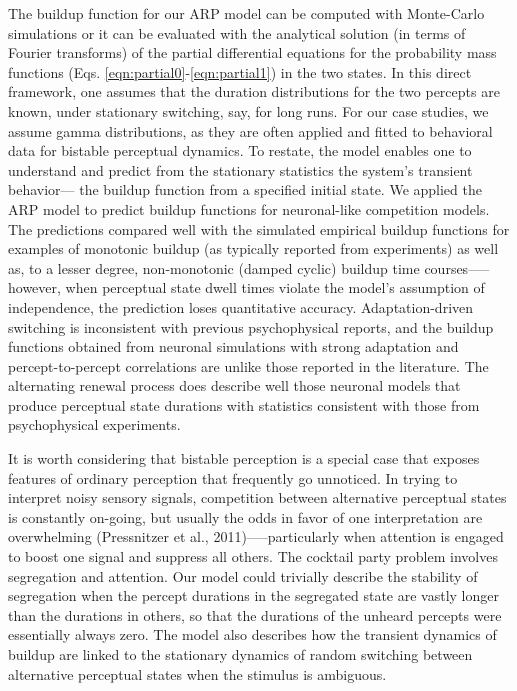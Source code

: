 The buildup function for our ARP model can be computed with Monte-Carlo simulations or it can be evaluated with the analytical solution (in terms of Fourier transforms) of the partial differential equations for the probability mass functions (Eqs. \ref{eqn:partial0}-\ref{eqn:partial1}) in the two states. In this direct framework, one assumes that the duration distributions for the two percepts are known, under stationary switching, say, for long runs. For our case studies, we assume gamma distributions, as they are often applied and fitted to behavioral data for bistable perceptual dynamics. To restate, the model enables one to understand and predict from the stationary statistics the system’s transient behavior--- the buildup function from a specified initial state. We applied the ARP model to predict buildup functions for neuronal-like competition models. The predictions compared well with the simulated empirical buildup functions for examples of monotonic buildup (as typically reported from experiments) as well as, to a lesser degree, non-monotonic (damped cyclic) buildup time courses—-- however, when perceptual state dwell times violate the model’s assumption of independence, the prediction loses quantitative accuracy. Adaptation-driven switching is inconsistent with previous psychophysical reports, and the buildup functions obtained from neuronal simulations with strong adaptation and percept-to-percept correlations are unlike those reported in the literature. The alternating renewal process does describe well those neuronal models that produce perceptual state durations with statistics consistent with those from psychophysical experiments.

It is worth considering that bistable perception is a special case that exposes features of ordinary perception that frequently go unnoticed. In trying to interpret noisy sensory signals, competition between alternative perceptual states is constantly on-going, but usually the odds in favor of one interpretation are overwhelming (Pressnitzer et al., 2011)—--particularly when attention is engaged to boost one signal and suppress all others. The cocktail party problem involves segregation and attention. Our model could trivially describe the stability of segregation when the percept durations in the segregated state are vastly longer than the durations in others, so that the durations of the unheard percepts were essentially always zero. The model also describes how the transient dynamics of buildup are linked to the stationary dynamics of random switching between alternative perceptual states when the stimulus is ambiguous.

